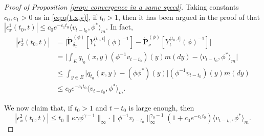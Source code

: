 \documentclass[12pt, a4paper]{amsart}
\theoremstyle{definition}
\numberwithin{equation}{section}
\begin{document}
\begin{proof}[Proof of Proposition \ref{prop: convergence in a same speed}]
	Taking constants $c_0, c_1>0$ as in \eqref{eq:q(t,x,y)}, if $t_0 > 1$, then it has been argued in the proof of
	\cite[Lemma 5.3]{RenSongSun2017Spine} that
$
	|\epsilon_x^1(t_0,t)|
	\leq c_0 e^{-c_1 t_0}\langle v_{t-t_0},\phi^* \rangle_m .
$
	In fact, 
\[\label{eq:epsilon-1}\begin{split}
	|\epsilon_x^1(t_0,t)|
	& = \big| \dot {\mathbf P}_{\delta_x}^{(\phi)} [Y^{(t_0,t]}_t(\phi)^{-1}] - \dot {\mathbf P}_\nu^{(\phi)} [Y^{(t_0,t]}_t(\phi)^{-1}] \big| \\
	& = \big|  \int_E  q_{t_0}(x,y)(\phi^{-1}v_{t-t_0})(y) m(dy) - \langle v_{t-t_0},\phi^* \rangle_m \big|\\
	& \leq \int_{y\in E} \big| q_{t_0}(x,y) - (\phi\phi^*)(y) \big| (\phi^{-1}v_{t-t_0})(y) m(dy)\\
	& \leq c_0 e^{-c_1 t_0}\langle v_{t-t_0},\phi^* \rangle_m .
\end{split}\]

	We now claim that, if $t_0 > 1$ and $t-t_0$ is large enough, then
\[\label{eq:upperbound_of_epsilon-2}
	|\epsilon_x^2(t_0,t)|
	\leq t_0\|\kappa\gamma\phi^{\gamma - 1}\|_{\infty} \cdot \|\phi^{-1}v_{t-t_0}\|^{\gamma_0-1}_\infty (1+c_0 e^{-c_1 t_0}) \langle v_{t-t_0},\phi^* \rangle_m.
\]
	

\end{proof}
\end{document}
